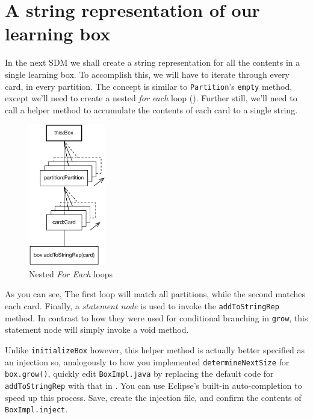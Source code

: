 \newpage
\hypertarget{sec:stringRep}{}
\chapter{A string representation of our learning box}
\label{sec_A string representation of our learning box}
\genHeader

In the next SDM we shall create a string representation for all the contents in a single learning box. To accomplish this, we will have to iterate through 
every card, in every partition. The concept is similar to \texttt{Partition}'s \texttt{empty} method, except we'll need to create a nested \emph{for each}
loop (). Further still, we'll need to call a helper method to accumulate the contents of each card to a single string.

\vspace{1cm}

\begin{figure}[htbp]
	\centering
	\includegraphics[width=0.3\textwidth]{../../org.moflon.doc.handbook.03_storyDiagrams/10_stringRep/goal_stringRep.pdf}
	\caption{Nested \emph{For Each} loops}
	\label{fig:goal_stringRep}
\end{figure}

\vspace{1cm}

As you can see, The first loop will match all partitions, while the second matches each card. Finally, a \emph{statement node} is used to invoke the
\texttt{addToStringRep} method. In contrast to how they were used for conditional branching in \texttt{grow}, this statement node will simply invoke a
void method.

Unlike \texttt{initializeBox} however, this helper method is actually better specified as an injection so, analogously to how you implemented
\texttt{deter\-mine\-Next\-Size} for \texttt{box.grow()}, quickly edit \texttt{BoxImpl.java} by replacing the default code for \texttt{addToStringRep} with that
in . You can use Eclipse's built-in auto-completion to speed up this process. Save, create the injection file, and
confirm the contents of \texttt{BoxImpl.inject}.

